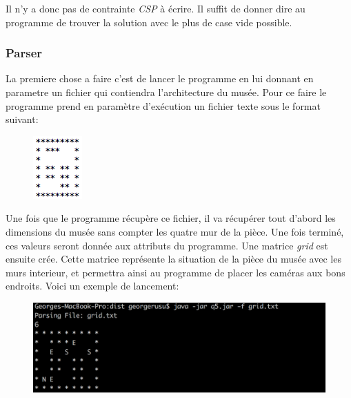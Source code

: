 \documentclass[a4paper,10pt]{article}
\begin{document}
\par Il n'y a donc pas de contrainte \emph{CSP} à écrire.  Il suffit de donner dire au programme de trouver la solution avec le plus de case vide possible.

\subsubsection{Parser}
\par La premiere chose a faire c'est de lancer le programme en lui donnant en parametre un fichier qui contiendra l'architecture du musée. Pour ce faire le programme prend en paramètre d'exécution un fichier texte sous le format suivant:
\begin{figure}[!h]
\begin{center}
\includegraphics{img/gridExample.png}
\end{center}
\end{figure}

\par Une fois que le programme récupère ce fichier, il va récupérer tout d'abord les dimensions du musée sans compter les quatre mur de la pièce.  Une fois terminé, ces valeurs seront donnée aux attributs du programme. Une matrice \emph{grid} est ensuite crée.  Cette matrice représente la situation de la pièce du musée avec les murs interieur, et permettra ainsi au programme de placer les caméras aux bons endroits. Voici un exemple de lancement:
\begin{figure}[!h]
\includegraphics[width=450px]{img/q5.png}

\end{figure}
\end{document}
